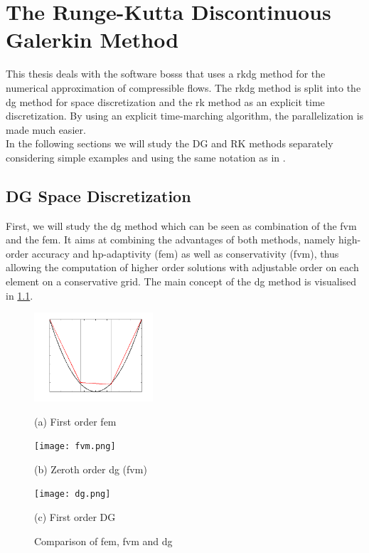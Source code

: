 \chapter{The Runge-Kutta Discontinuous Galerkin Method}
\label{rkdgm}
	This thesis deals with the software \gls{bosss} that uses a \gls{rkdg} method for the numerical approximation of compressible flows. The \gls{rkdg} method is split into the \gls{dg} method for space discretization and the \gls{rk} method as an explicit time discretization. By using an explicit time-marching algorithm, the parallelization is made much easier. \\ \indent
	In the following sections we will study the DG and RK methods separately considering simple examples and using the same notation as in \cite{mueller2014}.
	\section{DG Space Discretization}
		First, we will study the \gls{dg} method which can be seen as combination of the \gls{fvm} and the \gls{fem}. It aims at combining the advantages of both methods, namely high-order accuracy and hp-adaptivity (\gls{fem}) as well as conservativity (\gls{fvm}), thus allowing the computation of higher order solutions with adjustable order on each element on a conservative grid. The main concept of the \gls{dg} method is visualised in \cref{femfvm}.
		
		\begin{figure}[htp]
			\centering
			\begin{minipage}[b]{0.3\textwidth}
				\centering
				\includegraphics[height=3.3cm]{img/fem.png}
				\caption*{(a) First order \gls{fem}}
			\end{minipage}
			\quad
			\begin{minipage}[b]{0.3\textwidth}
				\centering
				\texttt{[image: fvm.png]}
				\caption*{(b) Zeroth order \gls{dg} (\gls{fvm})}
				\label{fig:case1afj4detail}
			\end{minipage}
			\quad
			\begin{minipage}[b]{0.3\textwidth}
				\centering
				\texttt{[image: dg.png]}
				\caption*{(c) First order DG}
				\label{femfafdavm}
			\end{minipage}
			\caption{Comparison of \gls{fem}, \gls{fvm} and \gls{dg}}
			\label{femfvm}
		\end{figure}

